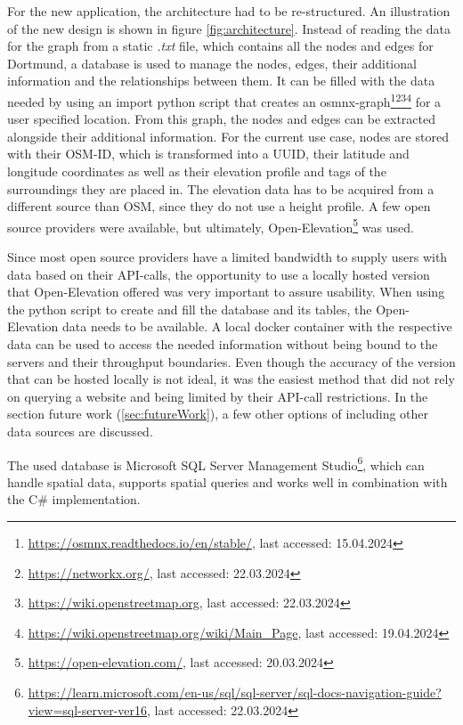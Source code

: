 For the new application, the architecture had to be re-structured.
An illustration of the new design is shown in figure \ref{fig:architecture}.
Instead of reading the data for the graph from a static \textit{.txt} file, which contains all the nodes and edges for Dortmund, a database is used to manage the nodes, edges, their additional information and the relationships between them. 
It can be filled with the data needed by using an import python script that creates an osmnx-graph\footnote{\url{https://osmnx.readthedocs.io/en/stable/}, last accessed: 15.04.2024}\footnote{\url{https://networkx.org/}, last accessed: 22.03.2024}\footnote{\url{https://wiki.openstreetmap.org}, last accessed: 22.03.2024}\footnote{\url{https://wiki.openstreetmap.org/wiki/Main_Page}, last accessed: 19.04.2024} for a user specified location. 
From this graph, the nodes and edges can be extracted alongside their additional information.
For the current use case, nodes are stored with their OSM-ID, which is transformed into a UUID, their latitude and longitude coordinates as well as their elevation profile and tags of the surroundings they are placed in.
The elevation data has to be acquired from a different source than OSM, since they do not use a height profile. 
A few open source providers were available, but ultimately, Open-Elevation\footnote{\url{https://open-elevation.com/}, last accessed: 20.03.2024} was used. 

Since most open source providers have a limited bandwidth to supply users with data based on their API-calls, the opportunity to use a locally hosted version that Open-Elevation offered was very important to assure usability.
When using the python script to create and fill the database and its tables, the Open-Elevation data needs to be available.
A local docker container with the respective data can be used to access the needed information without being bound to the servers and their throughput boundaries. 
Even though the accuracy of the version that can be hosted locally is not ideal, it was the easiest method that did not rely on querying a website and being limited by their API-call restrictions.
In the section future work (\ref{sec:futureWork}), a few other options of including other data sources are discussed.

The used database is Microsoft SQL Server Management Studio\footnote{\url{https://learn.microsoft.com/en-us/sql/sql-server/sql-docs-navigation-guide?view=sql-server-ver16}, last accessed: 22.03.2024}, which can handle spatial data, supports spatial queries and works well in combination with the C\# implementation.

